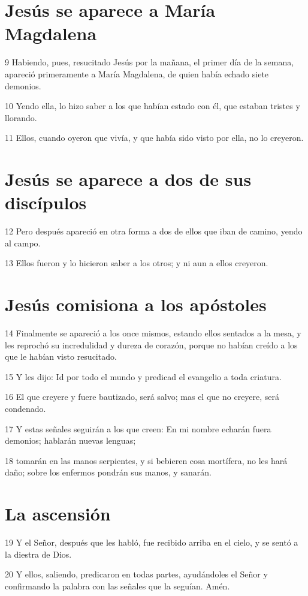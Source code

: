 \section*{Jesús se aparece a María Magdalena}

\par 9 Habiendo, pues, resucitado Jesús por la mañana, el primer día de la semana, apareció primeramente a María Magdalena, de quien había echado siete demonios.
\par 10 Yendo ella, lo hizo saber a los que habían estado con él, que estaban tristes y llorando.
\par 11 Ellos, cuando oyeron que vivía, y que había sido visto por ella, no lo creyeron.

\section*{Jesús se aparece a dos de sus discípulos}

\par 12 Pero después apareció en otra forma a dos de ellos que iban de camino, yendo al campo.
\par 13 Ellos fueron y lo hicieron saber a los otros; y ni aun a ellos creyeron.

\section*{Jesús comisiona a los apóstoles}

\par 14 Finalmente se apareció a los once mismos, estando ellos sentados a la mesa, y les reprochó su incredulidad y dureza de corazón, porque no habían creído a los que le habían visto resucitado.
\par 15 Y les dijo: Id por todo el mundo y predicad el evangelio a toda criatura.
\par 16 El que creyere y fuere bautizado, será salvo; mas el que no creyere, será condenado.
\par 17 Y estas señales seguirán a los que creen: En mi nombre echarán fuera demonios; hablarán nuevas lenguas;
\par 18 tomarán en las manos serpientes, y si bebieren cosa mortífera, no les hará daño; sobre los enfermos pondrán sus manos, y sanarán.

\section*{La ascensión}

\par 19 Y el Señor, después que les habló, fue recibido arriba en el cielo, y se sentó a la diestra de Dios.
\par 20 Y ellos, saliendo, predicaron en todas partes, ayudándoles el Señor y confirmando la palabra con las señales que la seguían. Amén.

